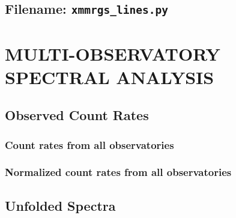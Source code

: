     	\subsection*{Filename: \texttt{xmmrgs\_lines.py}}
    	
    	
    \section{\MakeUppercase{Multi-Observatory Spectral Analysis}}
    	\subsection{Observed Count Rates}
    		
    		
    		
    		
    		
    		
    		
    		
    		\newpage
    		\subsubsection*{Count rates from all observatories}
    			
    		
    		\subsubsection*{Normalized count rates from all observatories}
    			
    			
    	\subsection{Unfolded Spectra}
    		
    		
    		
    		
    		
    		
    		
    		
    		
